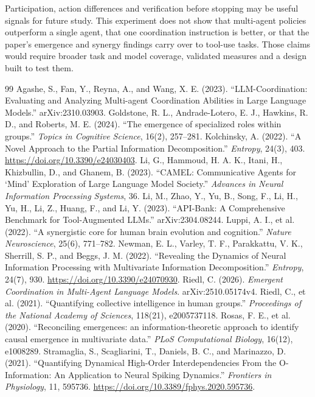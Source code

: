 \documentclass[12pt,a4paper,oneside]{report}
\begin{document}
Participation, action differences and verification before stopping may be useful signals for future study. This experiment does not show that multi-agent policies outperform a single agent, that one coordination instruction is better, or that the paper’s emergence and synergy findings carry over to tool-use tasks. Those claims would require broader task and model coverage, validated measures and a design built to test them.

\begin{thebibliography}{99}
 Agashe, S., Fan, Y., Reyna, A., and Wang, X. E. (2023). “LLM-Coordination: Evaluating and Analyzing Multi-agent Coordination Abilities in Large Language Models.” arXiv:2310.03903.
 Goldstone, R. L., Andrade-Lotero, E. J., Hawkins, R. D., and Roberts, M. E. (2024). “The emergence of specialized roles within groups.” \emph{Topics in Cognitive Science}, 16(2), 257–281.
 Kolchinsky, A. (2022). “A Novel Approach to the Partial Information Decomposition.” \emph{Entropy}, 24(3), 403. \url{https://doi.org/10.3390/e24030403}.
 Li, G., Hammoud, H. A. K., Itani, H., Khizbullin, D., and Ghanem, B. (2023). “CAMEL: Communicative Agents for ‘Mind’ Exploration of Large Language Model Society.” \emph{Advances in Neural Information Processing Systems}, 36.
 Li, M., Zhao, Y., Yu, B., Song, F., Li, H., Yu, H., Li, Z., Huang, F., and Li, Y. (2023). “API-Bank: A Comprehensive Benchmark for Tool-Augmented LLMs.” arXiv:2304.08244.
 Luppi, A. I., et al. (2022). “A synergistic core for human brain evolution and cognition.” \emph{Nature Neuroscience}, 25(6), 771–782.
 Newman, E. L., Varley, T. F., Parakkattu, V. K., Sherrill, S. P., and Beggs, J. M. (2022). “Revealing the Dynamics of Neural Information Processing with Multivariate Information Decomposition.” \emph{Entropy}, 24(7), 930. \url{https://doi.org/10.3390/e24070930}.
 Riedl, C. (2026). \emph{Emergent Coordination in Multi-Agent Language Models}. arXiv:2510.05174v4.
 Riedl, C., et al. (2021). “Quantifying collective intelligence in human groups.” \emph{Proceedings of the National Academy of Sciences}, 118(21), e2005737118.
 Rosas, F. E., et al. (2020). “Reconciling emergences: an information-theoretic approach to identify causal emergence in multivariate data.” \emph{PLoS Computational Biology}, 16(12), e1008289.
 Stramaglia, S., Scagliarini, T., Daniels, B. C., and Marinazzo, D. (2021). “Quantifying Dynamical High-Order Interdependencies From the O-Information: An Application to Neural Spiking Dynamics.” \emph{Frontiers in Physiology}, 11, 595736. \url{https://doi.org/10.3389/fphys.2020.595736}.

\end{thebibliography}
\end{document}
